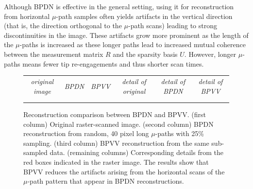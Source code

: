 \documentclass[twocolumn,oneside]{IEEEtran/IEEEtran}
\begin{document}
Although BPDN is effective in the general setting, using it for reconstruction
from horizontal $\mu$-path samples often yields artifacts in the vertical
direction (that is, the direction orthogonal to the $\mu$-path scans) leading to
strong discontinuities in the image. These artifacts grow more prominent as the
length of the $\mu$-paths is increased \cite{maxwell2014compressed} as these
longer paths lead to increased mutual coherence between the measurement matrix
$R$ and the sparsity basis $U$. However, longer $\mu$-paths means fewer
tip re-engagements and thus shorter scan times.
\noindent 
\begingroup \setlength{\tabcolsep}{1pt}
\begin{figure}[ht!]
  \centering
  \begin{tabular}{cccccc}
    \textit{\small original image} & \textit{\small BPDN} & \textit{\small BPVV}
    & \textit{\small detail of original} & \textit{\small detail of BPDN} & \textit{\small detail of BPVV} \\
    
    & 
    & 
    & 
    & 
    & \\
    
    & 
    & 
    & 
    & 
    & 
  \end{tabular}
  \caption{Reconstruction comparison between BPDN and BPVV. (first column)
    Original raster-scanned image. (second column) BPDN reconstruction from
    random, 40 pixel long $\mu$-paths with 25\% sampling. (third column) BPVV
    reconstruction from the same sub-sampled data. (remaining columns)
    Corresponding details from the red boxes indicated in the raster image. The
    results show that BPVV reduces the artifacts arising from the horizontal
    scans of the $\mu$-path pattern that appear in BPDN reconstructions.}
  \label{fig:BPTV_demonstration}
\end{figure}
\endgroup
\end{document}
